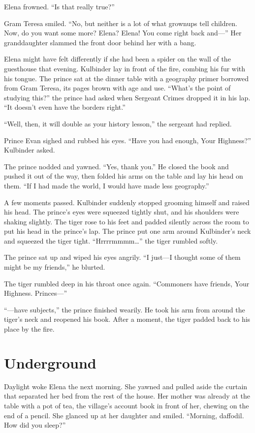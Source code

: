 \documentclass[10pt]{book}
\begin{document}
Elena frowned. ``Is that really true?''

Gram Teresa smiled. ``No, but neither is a lot of what grownups tell children. Now, do you want some more? Elena? Elena! You come right back and---'' Her granddaughter slammed the front door behind her with a bang.

Elena might have felt differently if she had been a spider on the wall of the guesthouse that evening. Kulbinder lay in front of the fire, combing his fur with his tongue. The prince sat at the dinner table with a geography primer borrowed from Gram Teresa, its pages brown with age and use. ``What's the point of studying this?'' the prince had asked when Sergeant Crimes dropped it in his lap. ``It doesn't even have the borders right.''

``Well, then, it will double as your history lesson,'' the sergeant had replied.

Prince Evan sighed and rubbed his eyes. ``Have you had enough, Your Highness?'' Kulbinder asked.

The prince nodded and yawned. ``Yes, thank you.'' He closed the book and pushed it out of the way, then folded his arms on the table and lay his head on them. ``If I had made the world, I would have made less geography.''

A few moments passed. Kulbinder suddenly stopped grooming himself and raised his head. The prince's eyes were squeezed tightly shut, and his shoulders were shaking slightly. The tiger rose to his feet and padded silently across the room to put his head in the prince's lap. The prince put one arm around Kulbinder's neck and squeezed the tiger tight. ``Hrrrrmmmm{\ldots}'' the tiger rumbled softly.

The prince sat up and wiped his eyes angrily. ``I just---I thought some of them might be my friends,'' he blurted.

The tiger rumbled deep in his throat once again. ``Commoners have friends, Your Highness.  Princes---''

``---have subjects,'' the prince finished wearily.  He took his arm from around the tiger's neck and reopened his book.  After a moment, the tiger padded back to his place by the fire.

\chapter{Underground}

Daylight woke Elena the next morning. She yawned and pulled aside the curtain that separated her bed from the rest of the house. Her mother was already at the table with a pot of tea, the village's account book in front of her, chewing on the end of a pencil.  She glanced up at her daughter and smiled. ``Morning, daffodil. How did you sleep?''
\end{document}
